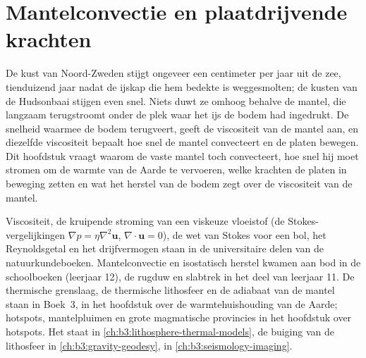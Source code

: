 \chapter{Mantelconvectie en plaatdrijvende krachten}\label{ch:b3:mantle-convection}

De kust van Noord-Zweden stijgt ongeveer een centimeter per
jaar uit de zee, tienduizend jaar nadat de ijskap die hem bedekte is weggesmolten; de
kusten van de Hudsonbaai stijgen even snel. Niets duwt ze omhoog behalve de mantel,
die langzaam terugstroomt onder de plek waar het ijs de bodem had ingedrukt. De snelheid
waarmee de bodem terugveert, geeft de viscositeit van de mantel aan, en diezelfde
viscositeit bepaalt hoe snel de mantel convecteert en de platen bewegen. Dit hoofdstuk
vraagt waarom de vaste mantel toch convecteert, hoe snel hij moet stromen om de
warmte van de Aarde te vervoeren, welke krachten de platen in beweging zetten en wat
het herstel van de bodem zegt over de viscositeit van de mantel.

\begin{recall}
Viscositeit, de kruipende stroming van een viskeuze vloeistof (de Stokes-vergelijkingen
$\nabla p = \eta\nabla^2\mathbf u$, $\nabla\cdot\mathbf u = 0$), de wet van Stokes
voor een bol, het Reynoldsgetal en het drijfvermogen staan in de universitaire delen van de
natuurkundeboeken. Mantelconvectie en isostatisch herstel kwamen aan bod in de
schoolboeken (leerjaar 12), de rugduw en slabtrek in het deel van leerjaar 11.
De thermische grenslaag, de thermische lithosfeer en de adiabaat van de mantel staan in
Boek~3, in het hoofdstuk over de warmtehuishouding van de Aarde; hotspots,
mantelpluimen en grote magmatische provincies in het hoofdstuk over hotspots.
Het  staat in \cref{ch:b3:lithosphere-thermal-models},
de buiging van de lithosfeer in \cref{ch:b3:gravity-geodesy},  in \cref{ch:b3:seismology-imaging}.
\end{recall}


